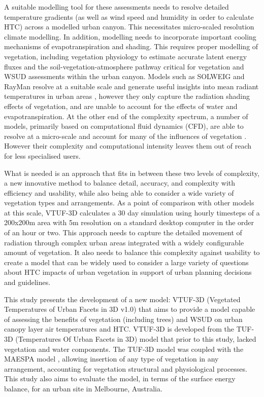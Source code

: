 \documentclass[final,3p,times,authoryear]{elsarticle}
\begin{document}
A suitable modelling tool for these assessments needs to resolve detailed temperature gradients (as well as wind speed and humidity in order to calculate HTC) across a modelled urban canyon. This necessitates micro-scaled resolution climate modelling. In addition, modelling needs to incorporate important cooling mechanisms of evapotranspiration and shading. This requires proper modelling of vegetation, including vegetation physiology to estimate accurate latent energy fluxes and the soil-vegetation-atmosphere pathway critical for vegetation and WSUD assessments within the urban canyon. Models such as SOLWEIG \citep{Lindberg2008a} and RayMan \citep{Matzarakis2007,Matzarakis2010} resolve at a suitable scale and generate useful insights into mean radiant temperatures in urban areas \citep{Chen2014a}, however they only capture the radiation shading effects of vegetation, and are unable to account for the effects of water and evapotranspiration. At the other end of the complexity spectrum, a number of models, primarily based on computational fluid dynamics (CFD), are able to resolve at a micro-scale and account for many of the influences of vegetation \citep{Bailey2014,Bailey2016,Kunz2000,Schlunzen2011a,Yamada2011,Bruse1999}. However their complexity and computational intensity leaves them out of reach for less specialised users.


What is needed is an approach that fits in between these two levels of complexity, a new innovative method to balance detail, accuracy, and complexity with efficiency and usability, while also being able to consider a wide variety of vegetation types and arrangements. As a point of comparison with other models at this scale, VTUF-3D calculates a 30 day simulation using hourly timesteps of a 200x200m area with 5m resolution on a standard desktop computer in the order of an hour or two. This approach needs to capture the detailed movement of radiation through complex urban areas integrated with a widely configurable amount of vegetation. It also needs to balance this complexity against usability to create a model that can be widely used to consider a large variety of questions about HTC impacts of urban vegetation in support of urban planning decisions and guidelines. 

This study presents the development of a new model: VTUF-3D (Vegetated Temperatures of Urban Facets in 3D v1.0) that aims to provide a model capable of assessing the benefits of vegetation (including trees) and WSUD on urban canopy layer air temperatures and HTC. VTUF-3D is developed from the TUF-3D (Temperatures Of Urban Facets in 3D) model \citep{Krayenhoff2007} that prior to this study, lacked vegetation and water components. The TUF-3D model was coupled with the MAESPA model \citep{Duursma2012}, allowing insertion of any type of vegetation in any arrangement, accounting for vegetation structural and physiological processes. This study also aims to evaluate the model, in terms of the surface energy balance, for an urban site in Melbourne, Australia. 
\end{document}
